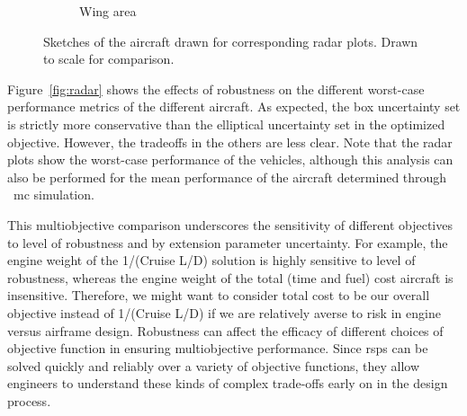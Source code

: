 \begin{figure}
\begin{center}
\begin{subfigure}{0.4\linewidth}
{}
            \caption{Wing area}
        \end{subfigure}
        \caption{Sketches of the aircraft drawn for corresponding radar plots. Drawn to scale for comparison.}
    \end{center}
\end{figure}

Figure~\ref{fig:radar} shows the effects of robustness on
the different worst-case performance metrics of the different aircraft.
As expected, the box uncertainty set is strictly more conservative than the elliptical uncertainty set
in the optimized objective. However, the tradeoffs in the others are less clear.
Note that the radar plots show the worst-case performance of the vehicles, although
this analysis can also be performed for the mean performance
of the aircraft determined through ~\gls{mc} simulation.

{\color{blue} This multiobjective comparison underscores the sensitivity of different
objectives to level of robustness and by extension parameter uncertainty.
For example, the engine weight of the 1/(Cruise L/D) solution is highly sensitive to level of robustness,
whereas the engine weight of the total (time and fuel) cost aircraft is insensitive.
Therefore, we might want to consider total cost to be our overall objective instead of 1/(Cruise L/D)
if we are relatively averse to risk in engine versus airframe design.
Robustness can affect the efficacy of different choices of objective function in ensuring multiobjective performance.
Since \gls{rsp}s can be solved quickly and reliably over a variety of objective functions,
they allow engineers to understand these kinds of complex trade-offs early on in the design process.}

